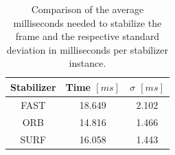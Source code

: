 \begin{table}
    \begin{center}
      \begin{tabular}{ | c | c | c | }
        \hline
        Stabilizer & Time $[ms]$ & $\sigma$ $[ms]$ \\
        \hline
        FAST & 18.649 & 2.102 \\
        ORB  & 14.816 & 1.466 \\
        SURF & 16.058 & 1.443 \\
        \hline
      \end{tabular}
    \end{center}
    \caption{
        Comparison of the average milliseconds needed to stabilize the frame and the respective standard deviation in milliseconds per stabilizer instance.
    }
    \label{tab:dynamic_stabilization_speeds}
  \end{table}